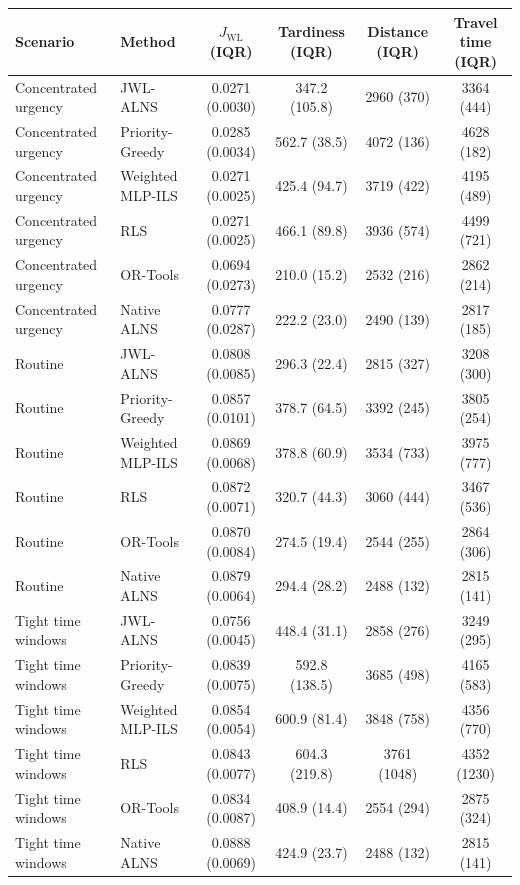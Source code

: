 \documentclass[11pt,a4paper]{article}
\begin{document}
\begin{center}
\scriptsize
\setlength{\tabcolsep}{4pt}
\begin{tabular}{llcccc}
\toprule
Scenario & Method & $J_{\mathrm{WL}}$ (IQR) & Tardiness (IQR) & Distance (IQR) & Travel time (IQR) \\
\midrule
Concentrated urgency & JWL-ALNS & 0.0271 (0.0030) & 347.2 (105.8) & 2960 (370) & 3364 (444) \\
Concentrated urgency & Priority-Greedy & 0.0285 (0.0034) & 562.7 (38.5) & 4072 (136) & 4628 (182) \\
Concentrated urgency & Weighted MLP-ILS & 0.0271 (0.0025) & 425.4 (94.7) & 3719 (422) & 4195 (489) \\
Concentrated urgency & RLS & 0.0271 (0.0025) & 466.1 (89.8) & 3936 (574) & 4499 (721) \\
Concentrated urgency & OR-Tools & 0.0694 (0.0273) & 210.0 (15.2) & 2532 (216) & 2862 (214) \\
Concentrated urgency & Native ALNS & 0.0777 (0.0287) & 222.2 (23.0) & 2490 (139) & 2817 (185) \\
Routine & JWL-ALNS & 0.0808 (0.0085) & 296.3 (22.4) & 2815 (327) & 3208 (300) \\
Routine & Priority-Greedy & 0.0857 (0.0101) & 378.7 (64.5) & 3392 (245) & 3805 (254) \\
Routine & Weighted MLP-ILS & 0.0869 (0.0068) & 378.8 (60.9) & 3534 (733) & 3975 (777) \\
Routine & RLS & 0.0872 (0.0071) & 320.7 (44.3) & 3060 (444) & 3467 (536) \\
Routine & OR-Tools & 0.0870 (0.0084) & 274.5 (19.4) & 2544 (255) & 2864 (306) \\
Routine & Native ALNS & 0.0879 (0.0064) & 294.4 (28.2) & 2488 (132) & 2815 (141) \\
Tight time windows & JWL-ALNS & 0.0756 (0.0045) & 448.4 (31.1) & 2858 (276) & 3249 (295) \\
Tight time windows & Priority-Greedy & 0.0839 (0.0075) & 592.8 (138.5) & 3685 (498) & 4165 (583) \\
Tight time windows & Weighted MLP-ILS & 0.0854 (0.0054) & 600.9 (81.4) & 3848 (758) & 4356 (770) \\
Tight time windows & RLS & 0.0843 (0.0077) & 604.3 (219.8) & 3761 (1048) & 4352 (1230) \\
Tight time windows & OR-Tools & 0.0834 (0.0087) & 408.9 (14.4) & 2554 (294) & 2875 (324) \\
Tight time windows & Native ALNS & 0.0888 (0.0069) & 424.9 (23.7) & 2488 (132) & 2815 (141) \\
\bottomrule
\end{tabular}
\end{center}
\end{document}

